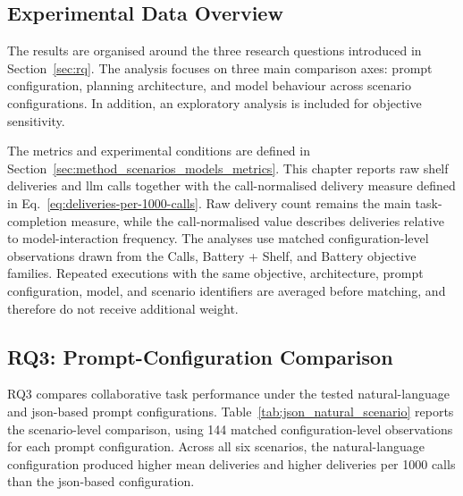 \subsection{Experimental Data Overview}

The results are organised around the three research questions introduced in Section~\ref{sec:rq}. The analysis focuses on three main comparison axes: prompt configuration, planning architecture, and model behaviour across scenario configurations. In addition, an exploratory analysis is included for objective sensitivity.

The metrics and experimental conditions are defined in Section~\ref{sec:method_scenarios_models_metrics}. This chapter reports raw shelf deliveries and \gls{llm} calls together with the call-normalised delivery measure defined in Eq.~\ref{eq:deliveries-per-1000-calls}. Raw delivery count remains the main task-completion measure, while the call-normalised value describes deliveries relative to model-interaction frequency. The analyses use matched configuration-level observations drawn from the Calls, Battery + Shelf, and Battery objective families. Repeated executions with the same objective, architecture, prompt configuration, model, and scenario identifiers are averaged before matching, and therefore do not receive additional weight.

\subsection{RQ3: Prompt-Configuration Comparison}
\label{sec:results_prompt_representation}

RQ3 compares collaborative task performance under the tested natural-language and \gls{json}-based prompt configurations. Table~\ref{tab:json_natural_scenario} reports the scenario-level comparison, using 144 matched configuration-level observations for each prompt configuration. Across all six scenarios, the natural-language configuration produced higher mean deliveries and higher deliveries per 1000 calls than the \gls{json}-based configuration.

